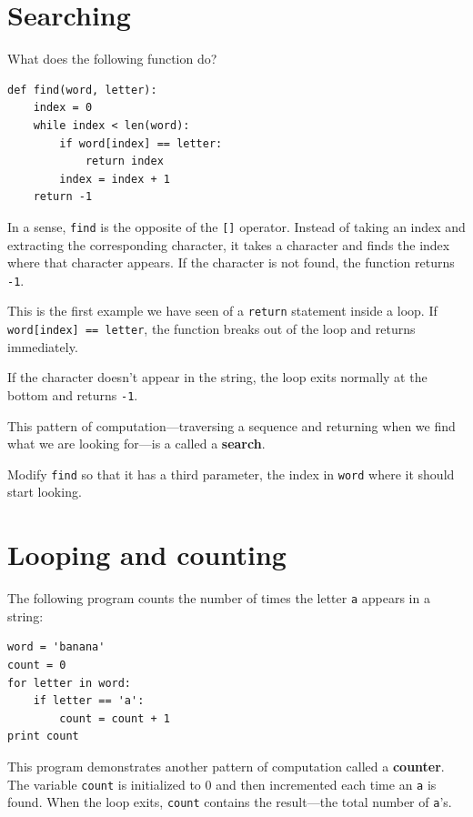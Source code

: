 \documentclass[10pt]{book}
\begin{document}


\section{Searching}
\label{find}

What does the following function do?



\beforeverb
\beforeverb
\begin{verbatim}
def find(word, letter):
    index = 0
    while index < len(word):
        if word[index] == letter:
            return index
        index = index + 1
    return -1
\end{verbatim}
\afterverb
%
In a sense, {\tt find} is the opposite of the {\tt []} operator.
Instead of taking an index and extracting the corresponding character,
it takes a character and finds the index where that character
appears.  If the character is not found, the function returns {\tt
-1}.

This is the first example we have seen of a {\tt return} statement
inside a loop.  If {\tt word[index] == letter}, the function breaks
out of the loop and returns immediately.

If the character doesn't appear in the string, the loop
exits normally at the bottom and returns {\tt -1}.

This pattern of computation---traversing a sequence and returning
when we find what we are looking for---is a called a {\bf search}.


\begin{ex}
Modify {\tt find} so that it has a
third parameter, the index in {\tt word} where it should start
looking.
\end{ex}


\section{Looping and counting}
\label{counter}


The following program counts the number of times the letter {\tt a}
appears in a string:

\beforeverb
\begin{verbatim}
word = 'banana'
count = 0
for letter in word:
    if letter == 'a':
        count = count + 1
print count
\end{verbatim}
\afterverb
%
This program demonstrates another pattern of computation called a {\bf
counter}.  The variable {\tt count} is initialized to 0 and then
incremented each time an {\tt a} is found.
When the loop exits, {\tt count}
contains the result---the total number of {\tt a}'s.
\end{document}
